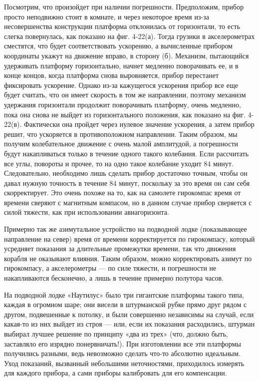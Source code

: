 \documentclass[11pt,oneside]{article}
\begin{document}
Посмотрим, что произойдет при наличии погрешности. Предположим, прибор просто неподвижно стоит в комнате, и через некоторое время из-за несовершенства конструкции платформа отклонилась от горизонтали, то есть слегка повернулась, как показано на фиг. 4-22(а). Тогда грузики в акселерометрах сместятся, что будет соответствовать ускорению, а вычисленные прибором координаты укажут на движение вправо, в сторону (б). Механизм, пытающийся удерживать платформу горизонтально, начнет медленно поворачивать ее, и в конце концов, когда платформа снова выровняется, прибор перестанет фиксировать ускорение. Однако из-за кажущегося ускорения прибор все еще будет считать, что он имеет скорость в том же направлении, поэтому механизм удержания горизонтали продолжит поворачивать платформу, очень медленно, пока она снова не выйдет из горизонтального положения, как показано на фиг. 4-22(в). Фактически она пройдет через нулевое значение ускорения, а затем прибор решит, что ускоряется в противоположном направлении. Таким образом, мы получим колебательное движение с очень малой амплитудой, а погрешности будут накапливаться только в течение одного такого колебания. Если рассчитать все углы, повороты и прочее, то на одно такое колебание уходит \(84\) минут. Следовательно, необходимо лишь сделать прибор достаточно точным, чтобы он давал нужную точность в течение \(84\) минут, поскольку за это время он сам себя скорректирует. Это очень похоже на то, как на самолете гирокомпас время от времени сверяют с магнитным компасом, но в данном случае прибор сверяется с силой тяжести, как при использовании авиагоризонта.\par

Примерно так же азимутальное устройство на подводной лодке (показывающее направление на север) время от времени корректируется по гирокомпасу, который усредняет показания за длительные промежутки времени, так что движения корабля не оказывают влияния. Таким образом, можно корректировать азимут по гирокомпасу, а акселерометры --- по силе тяжести, и погрешности не накапливаются бесконечно, а лишь в течение примерно полутора часов.\par

На подводной лодке «Наутилус» было три гигантские платформы такого типа, каждая в огромном шаре; они висели в штурманской рубке прямо друг рядом с другом, подвешенные к потолку, и были совершенно независимы на случай, если какая-то из них выйдет из строя --- или, если их показания расходились, штурман выбирал лучшее решение по принципу «два из трех» (что, должно быть, заставляло его изрядно понервничать!). При изготовлении все эти платформы получились разными, ведь невозможно сделать что-то абсолютно идеальным. Уход показаний, вызванный небольшими неточностями, приходилось измерять для каждого прибора, а сами приборы калибровать для его компенсации.\par
\end{document}

